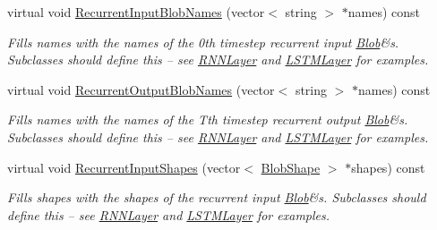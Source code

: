\begin{DoxyCompactItemize}
\mbox{\label{classcaffe_1_1_l_s_t_m_layer_af6727ebb2afc6a8ba17433600f2c1327}} 
virtual void \mbox{\hyperlink{classcaffe_1_1_l_s_t_m_layer_af6727ebb2afc6a8ba17433600f2c1327}{Recurrent\+Input\+Blob\+Names}} (vector$<$ string $>$ $\ast$names) const
\begin{DoxyCompactList}\small\item\em Fills names with the names of the 0th timestep recurrent input \mbox{\hyperlink{classcaffe_1_1_blob}{Blob}}\&s. Subclasses should define this -- see \mbox{\hyperlink{classcaffe_1_1_r_n_n_layer}{R\+N\+N\+Layer}} and \mbox{\hyperlink{classcaffe_1_1_l_s_t_m_layer}{L\+S\+T\+M\+Layer}} for examples. \end{DoxyCompactList}\item 
\mbox{\label{classcaffe_1_1_l_s_t_m_layer_a8cdfff877abf6604e07b46bac7c8767f}} 
virtual void \mbox{\hyperlink{classcaffe_1_1_l_s_t_m_layer_a8cdfff877abf6604e07b46bac7c8767f}{Recurrent\+Output\+Blob\+Names}} (vector$<$ string $>$ $\ast$names) const
\begin{DoxyCompactList}\small\item\em Fills names with the names of the Tth timestep recurrent output \mbox{\hyperlink{classcaffe_1_1_blob}{Blob}}\&s. Subclasses should define this -- see \mbox{\hyperlink{classcaffe_1_1_r_n_n_layer}{R\+N\+N\+Layer}} and \mbox{\hyperlink{classcaffe_1_1_l_s_t_m_layer}{L\+S\+T\+M\+Layer}} for examples. \end{DoxyCompactList}\item 
\mbox{\label{classcaffe_1_1_l_s_t_m_layer_ab86ed71632077cfa6ab758a35fe94453}} 
virtual void \mbox{\hyperlink{classcaffe_1_1_l_s_t_m_layer_ab86ed71632077cfa6ab758a35fe94453}{Recurrent\+Input\+Shapes}} (vector$<$ \mbox{\hyperlink{classcaffe_1_1_blob_shape}{Blob\+Shape}} $>$ $\ast$shapes) const
\begin{DoxyCompactList}\small\item\em Fills shapes with the shapes of the recurrent input \mbox{\hyperlink{classcaffe_1_1_blob}{Blob}}\&s. Subclasses should define this -- see \mbox{\hyperlink{classcaffe_1_1_r_n_n_layer}{R\+N\+N\+Layer}} and \mbox{\hyperlink{classcaffe_1_1_l_s_t_m_layer}{L\+S\+T\+M\+Layer}} for examples. \end{DoxyCompactList}\item 
\mbox{\label{classcaffe_1_1_l_s_t_m_layer_a51f73c86adfb8eface5aa9dce3d8ba66}} 

\end{DoxyCompactItemize}
